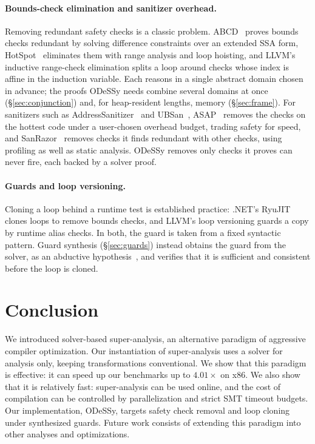 \documentclass[acmsmall,screen,nonacm]{acmart}
\newcommand{\odessy}{ODeSSy}
\newcommand{\tool}{\odessy}
\begin{document}
\paragraph{Bounds-check elimination and sanitizer overhead.}
Removing redundant safety checks is a classic problem.
ABCD~\cite{bodik2000abcd} proves bounds checks redundant by solving
difference constraints over an extended SSA form,
HotSpot~\cite{wurthinger2007hotspot} eliminates them with range analysis
and loop hoisting, and LLVM's inductive range-check elimination splits a
loop around checks whose index is affine in the induction variable. Each
reasons in a single abstract domain chosen in advance; the proofs \tool{}
needs combine several domains at once (\S\ref{sec:conjunction}) and, for
heap-resident lengths, memory (\S\ref{sec:frame}). For sanitizers such as
AddressSanitizer~\cite{serebryany2012asan} and UBSan~\cite{ubsanDocs},
ASAP~\cite{wagner2015asap} removes the checks on the hottest code under a
user-chosen overhead budget, trading safety for speed, and
SanRazor~\cite{zhang2021sanrazor} removes checks it finds redundant with
other checks, using profiling as well as static analysis. \tool{} removes
only checks it proves can never fire, each backed by a solver proof.

\paragraph{Guards and loop versioning.}
Cloning a loop behind a runtime test is established practice: .NET's
RyuJIT clones loops to remove bounds checks, and LLVM's loop versioning
guards a copy by runtime alias checks. In both, the guard is taken from a
fixed syntactic pattern. Guard synthesis (\S\ref{sec:guards}) instead
obtains the guard from the solver, as an abductive
hypothesis~\cite{dillig2012abductive,dillig2013abductive}, and verifies
that it is sufficient and consistent before the loop is cloned.

\section{Conclusion}
\label{sec:conclusion}
We introduced solver-based super-analysis, an alternative paradigm of aggressive compiler optimization. Our instantiation of super-analysis uses a solver for analysis only, keeping transformations conventional. We show that this paradigm is effective: it can speed up our benchmarks up to $4.01\times$ on x86. We also show that it is relatively fast: super-analysis can be used online, and the cost of compilation can be controlled by parallelization and strict SMT timeout budgets. Our implementation, \tool{}, targets safety check removal and loop cloning under synthesized guards. Future work consists of extending this paradigm into other analyses and optimizations.
\end{document}

